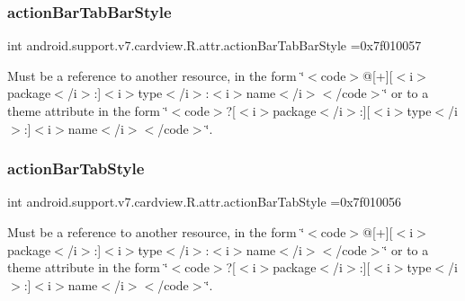 \subsubsection{\texorpdfstring{action\+Bar\+Tab\+Bar\+Style}{actionBarTabBarStyle}}
{\footnotesize\ttfamily int android.\+support.\+v7.\+cardview.\+R.\+attr.\+action\+Bar\+Tab\+Bar\+Style =0x7f010057\hspace{0.3cm}{\ttfamily [static]}}

Must be a reference to another resource, in the form \char`\"{}$<$code$>$@\mbox{[}+\mbox{]}\mbox{[}$<$i$>$package$<$/i$>$\+:\mbox{]}$<$i$>$type$<$/i$>$\+:$<$i$>$name$<$/i$>$$<$/code$>$\char`\"{} or to a theme attribute in the form \char`\"{}$<$code$>$?\mbox{[}$<$i$>$package$<$/i$>$\+:\mbox{]}\mbox{[}$<$i$>$type$<$/i$>$\+:\mbox{]}$<$i$>$name$<$/i$>$$<$/code$>$\char`\"{}. \mbox{\label{classandroid_1_1support_1_1v7_1_1cardview_1_1R_1_1attr_abb2876dd6a1fbbb1ffa524f17eb9cf2c}} 
\subsubsection{\texorpdfstring{action\+Bar\+Tab\+Style}{actionBarTabStyle}}
{\footnotesize\ttfamily int android.\+support.\+v7.\+cardview.\+R.\+attr.\+action\+Bar\+Tab\+Style =0x7f010056\hspace{0.3cm}{\ttfamily [static]}}

Must be a reference to another resource, in the form \char`\"{}$<$code$>$@\mbox{[}+\mbox{]}\mbox{[}$<$i$>$package$<$/i$>$\+:\mbox{]}$<$i$>$type$<$/i$>$\+:$<$i$>$name$<$/i$>$$<$/code$>$\char`\"{} or to a theme attribute in the form \char`\"{}$<$code$>$?\mbox{[}$<$i$>$package$<$/i$>$\+:\mbox{]}\mbox{[}$<$i$>$type$<$/i$>$\+:\mbox{]}$<$i$>$name$<$/i$>$$<$/code$>$\char`\"{}. \mbox{\label{classandroid_1_1support_1_1v7_1_1cardview_1_1R_1_1attr_a735d229e3a8a41c55787e41d7db51a85}} 
